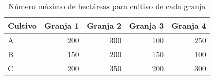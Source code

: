 \begin{table}[H]
\centering
\begin{tabular}{lrrrr}
\hline
Cultivo & Granja 1 & Granja 2 & Granja 3 & Granja 4 \\ \hline
A       & 200      & 300      & 100      & 250      \\
B       & 150      & 200      & 150      & 100      \\
C       & 200      & 350      & 200      & 300      \\ \hline
\end{tabular}
\caption{Número máximo de hectáreas para cultivo de cada granja}
\label{tabla:2}
\end{table}

